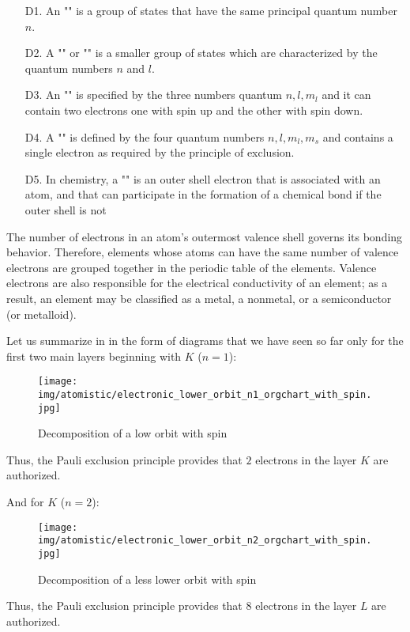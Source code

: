 	 \begin{enumerate}
		\item[D1.] An "" is a group of states that have the same principal quantum number $n$.

		\item[D2.] A "" or "" is a smaller group of states which are characterized by the quantum numbers $n$ and $l$.

		\item[D3.] An "" is specified by the three numbers quantum $n,l,m_l$ and it can contain two electrons one with spin up and the other with spin down.

		\item[D4.] A "" is defined by the four quantum numbers $n,l,m_l,m_s$ and contains a single electron as required by the principle of exclusion.
		
		\item[D5.] In chemistry, a "" is an outer shell electron that is associated with an atom, and that can participate in the formation of a chemical bond if the outer shell is not 
	\end{enumerate}
	The number of electrons in an atom's outermost valence shell governs its bonding behavior. Therefore, elements whose atoms can have the same number of valence electrons are grouped together in the periodic table of the elements. Valence electrons are also responsible for the electrical conductivity of an element; as a result, an element may be classified as a metal, a nonmetal, or a semiconductor (or metalloid).
	
	Let us summarize in in the form of diagrams that we have seen so far only for the first two main layers beginning with $K$ ($n=1$):
	\begin{figure}[H]
		\centering
		\texttt{[image: img/atomistic/electronic\_lower\_orbit\_n1\_orgchart\_with\_spin.jpg]}
		\caption{Decomposition of a low orbit with spin}
	\end{figure}
	Thus, the Pauli exclusion principle provides that  $2$ electrons in the layer $K$ are authorized.

	And for $K$ ($n=2$):
	\begin{figure}[H]
		\centering
		\texttt{[image: img/atomistic/electronic\_lower\_orbit\_n2\_orgchart\_with\_spin.jpg]}
		\caption{Decomposition of a less lower orbit with spin}
	\end{figure}
	Thus, the Pauli exclusion principle provides that  $8$ electrons in the layer $L$ are authorized.
	
